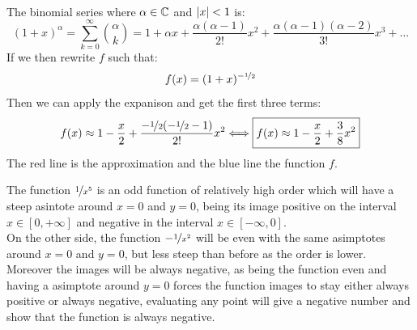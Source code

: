 \documentclass{report}
\begin{document}
  \hspace{0cm}\\
  \noindent The binomial series where $\alpha\in\mathbb{C}$ and $\lvert x\rvert<1$ is:
  \[(1+x)^\alpha=\sum_{k=0}^{\infty} \binom{\alpha}{k} = 1+\alpha x+\dfrac{\alpha(\alpha-1)}{2!}x^2+\dfrac{\alpha(\alpha-1)(\alpha-2)}{3!}x^3+\dots\]
  If we then rewrite $f$ such that:
  \[f(x)=(1+x)^{-\nicefrac{1}{2}}\]
  Then we can apply the expanison and get the first three terms:
  \[f(x)\approx 1-\dfrac{x}{2}+\dfrac{-\nicefrac{1}{2}(-\nicefrac{1}{2}-1)}{2!}x^2\Longleftrightarrow\boxed{f(x)\approx 1-\dfrac{x}{2}+\dfrac{3}{8}x^2}\]
  The red line is the approximation and the blue line the function $f$.

\clearpage
  \vspace{0.4cm}
  \noindent The function $\nicefrac{1}{x^5}$ is an odd function of relatively high order which will have a steep asintote around $x=0$ and $y=0$, being its image positive on the interval $x\in[0,+\infty]$ and negative in the interval $x\in[-\infty,0]$.\\
  
  \noindent On the other side, the function $-\nicefrac{1}{x^2}$ will be even with the same asimptotes around $x=0$ and $y=0$, but less steep than before as the order is lower. Moreover the images will be always negative, as being the function even and having a asimptote around $y=0$ forces the function images to stay either always positive or always negative, evaluating any point will give a negative number and show that the function is always negative.\\
\end{document}
